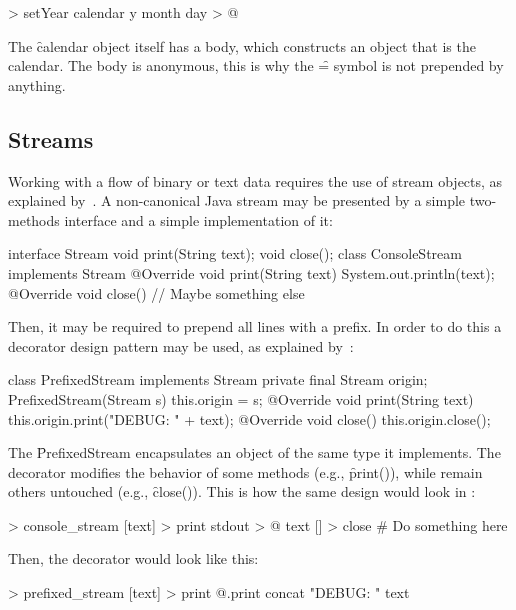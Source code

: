 \begin{eocode}
[y] > setYear
  calendar y month day > @
\end{eocode}

The \f{calendar} object itself has a body, which constructs
an object that is the calendar. The body is anonymous, this is why
the \f{=} symbol is not prepended by anything.

\subsection{Streams}

Working with a flow of binary or text data requires the use
of stream objects, as explained by~\citet[p.226]{metsker2002}.
A non-canonical Java stream may be presented by a simple
two-methods interface and a simple implementation of it:

\begin{eocode}
interface Stream {
  void print(String text);
  void close();
}
class ConsoleStream implements Stream {
  @Override
  void print(String text) {
    System.out.println(text);
  }
  @Override
  void close() {
    // Maybe something else
  }
}
\end{eocode}

Then, it may be required to prepend all lines with a prefix. In order
to do this a decorator design pattern may be used,
as explained by~\citet[p.196]{gamma1994design}:

\begin{eocode}
class PrefixedStream implements Stream {
  private final Stream origin;
  PrefixedStream(Stream s) {
    this.origin = s;
  }
  @Override
  void print(String text) {
    this.origin.print("DEBUG: " + text);
  }
  @Override
  void close() {
    this.origin.close();
  }
}
\end{eocode}

The \f{PrefixedStream} encapsulates an object of the same type it
implements. The decorator modifies the behavior of some methods (e.g., \f{print()}), while
remain others untouched (e.g., \f{close()}). This is how the same design
would look in \eo{}:

\begin{eocode}
[] > console_stream
  [text] > print
    stdout > @
      text
  [] > close
    # Do something here
\end{eocode}

Then, the decorator would look like this:

\begin{eocode}
[@] > prefixed_stream
  [text] > print
    @.print
      concat
        "DEBUG: "
        text
\end{eocode}

